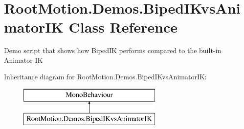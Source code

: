 \hypertarget{class_root_motion_1_1_demos_1_1_biped_i_kvs_animator_i_k}{}\section{Root\+Motion.\+Demos.\+Biped\+I\+Kvs\+Animator\+IK Class Reference}
\label{class_root_motion_1_1_demos_1_1_biped_i_kvs_animator_i_k}


Demo script that shows how Biped\+IK performs compared to the built-\/in Animator IK  


Inheritance diagram for Root\+Motion.\+Demos.\+Biped\+I\+Kvs\+Animator\+IK\+:\begin{figure}[H]
\begin{center}
\leavevmode
\includegraphics[height=2.000000cm]{class_root_motion_1_1_demos_1_1_biped_i_kvs_animator_i_k}
\end{center}
\end{figure}
